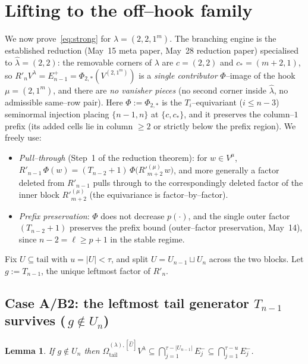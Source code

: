 \documentclass[11pt]{article}
\newtheorem{lemma}[theorem]{Lemma}
\theoremstyle{definition}
\newcommand{\Vlam}{V^\lambda}
\newcommand{\Vmu}{V^\mu}
\newcommand{\Rp}{{R'}}
\newcommand{\Ep}[1]{E^{+}_{#1}}
\newcommand{\Em}[1]{E^{-}_{#1}}
\newcommand{\OmU}{\Omega^{(\lambda),[\widehat U]}_{\mathrm{tail}}}
\newcommand{\hatl}{\widehat\lambda}
\begin{document}
\section{Lifting to the off--hook family}\label{sec:offhook}

We now prove~\eqref{eq:strong} for $\lambda=(2,2,1^m)$. The branching engine is the
established reduction (May~15 meta paper, May~28 reduction paper) specialised to
$\hatl=(2,2)$: the removable corners of $\lambda$ are $c=(2,2)$ and $c_*=(m+2,1)$, so
$\Rp_n\Vlam=\Ep{n-1}=\Phi_{2,*}(V^{(2,1^m)})$ is a \emph{single contributor}
$\Phi$--image of the hook $\mu=(2,1^m)$, and there are \emph{no vanisher pieces}
(no second corner inside $\hatl$, no admissible same--row pair). Here $\Phi:=\Phi_{2,*}$
is the $T_i$--equivariant ($i\le n-3$) seminormal injection placing $\{n-1,n\}$ at
$\{c,c_*\}$, and it preserves the column--$1$ prefix (its added cells lie in column $\ge2$
or strictly below the prefix region). We freely use:
\begin{itemize}[topsep=0.2em,itemsep=0.1em]
\item \emph{Pull--through} (Step~1 of the reduction theorem): for $w\in\Vmu$,
   $\Rp_{n-1}\,\Phi(w)=(T_{n-2}+1)\,\Phi\!\big(\Rp^{(\mu)}_{m+2}\,w\big)$, and more
   generally a factor deleted from $\Rp_{n-1}$ pulls through to the correspondingly
   deleted factor of the inner block $\Rp^{(\mu)}_{m+2}$ (the equivariance is
   factor--by--factor).
\item \emph{Prefix preservation}: $\Phi$ does not decrease $p(\cdot)$, and the single outer
   factor $(T_{n-2}+1)$ preserves the prefix bound (outer--factor preservation, May~14),
   since $n-2=\ell\ge p+1$ in the stable regime.
\end{itemize}

Fix $U\subseteq\mathrm{tail}$ with $u=|U|<\tau$, and split $U=U_{n-1}\sqcup U_n$ across the
two blocks. Let $g:=T_{n-1}$, the unique leftmost factor of $\Rp_n$.

\subsection*{Case A/B2: the leftmost tail generator $T_{n-1}$ survives ($\,g\notin U_n$)}

\begin{lemma}\label{lem:retain}
If $g\notin U_n$ then $\OmU{}\Vlam\subseteq
\bigcap_{j=1}^{\tau-|U_{n-1}|}\Em j\subseteq\bigcap_{j=1}^{\tau-u}\Em j$.
\end{lemma}
\end{document}
